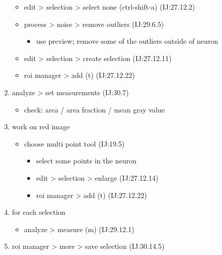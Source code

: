 \documentclass[11pt]{article}
\begin{document}
\begin{enumerate}
\begin{itemize}
\item edit > selection > select none (ctrl-shift-a) (IJ:27.12.2)
\item process > noise > remove outliers (IJ:29.6.5)
\begin{itemize}
\item use preview; remove some of the outliers outside of neuron
\end{itemize}
\item edit > selection > create selection (IJ:27.12.11)
\item roi manager > add (t) (IJ:27.12.22)
\end{itemize}
\item analyze > set measurements (IJ:30.7)
\begin{itemize}
\item check: area / area fraction / mean gray value
\end{itemize}
\item work on red image
\begin{itemize}
\item choose multi point tool (IJ:19.5)
\begin{itemize}
\item select some points in the neuron
\item edit > selection > enlarge (IJ:27.12.14)
\item roi manager > add (t) (IJ:27.12.22)
\end{itemize}
\end{itemize}
\item for each selection
\begin{itemize}
\item analyze > measure (m) (IJ:29.12.1)
\end{itemize}
\item roi manager > more > save selection (IJ:30.14.5)
\end{enumerate}
\end{document}
